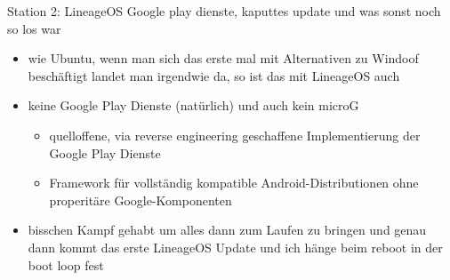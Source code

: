 \documentclass[14pt,compress,usenames,dvipsnames,aspectratio=169]{beamer}
\begin{document}
\begin{frame}{Station 2: LineageOS}
    Google play dienste, kaputtes update und was sonst noch so los war
    \begin{itemize}
        \item wie Ubuntu, wenn man sich das erste mal mit Alternativen zu Windoof beschäftigt landet man irgendwie da, so ist das mit LineageOS auch 
        \item keine Google Play Dienste (natürlich) und auch kein microG
        \begin{itemize}
            \item quelloffene, via reverse engineering geschaffene Implementierung der Google Play Dienste 
            \item Framework für vollständig kompatible Android-Distributionen ohne properitäre Google-Komponenten
        \end{itemize}
        \item bisschen Kampf gehabt um alles dann zum Laufen zu bringen und genau dann kommt das erste LineageOS Update und ich hänge beim reboot in der boot loop fest
    \end{itemize}


\end{frame}
\end{document}
